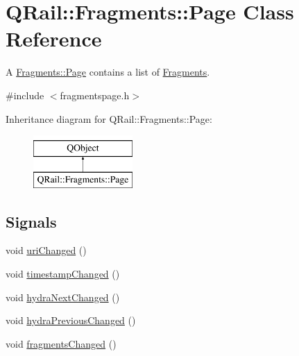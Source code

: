 \hypertarget{classQRail_1_1Fragments_1_1Page}{}\section{Q\+Rail\+::Fragments\+::Page Class Reference}
\label{classQRail_1_1Fragments_1_1Page}


A \mbox{\hyperlink{classQRail_1_1Fragments_1_1Page}{Fragments\+::\+Page}} contains a list of \mbox{\hyperlink{namespaceQRail_1_1Fragments}{Fragments}}.  




{\ttfamily \#include $<$fragmentspage.\+h$>$}

Inheritance diagram for Q\+Rail\+::Fragments\+::Page\+:\begin{figure}[H]
\begin{center}
\leavevmode
\includegraphics[height=2.000000cm]{classQRail_1_1Fragments_1_1Page}
\end{center}
\end{figure}
\subsection*{Signals}
\begin{DoxyCompactItemize}
\item 
void \mbox{\hyperlink{classQRail_1_1Fragments_1_1Page_a87f9b4f40af2e858ea3e046a2107631e}{uri\+Changed}} ()
\item 
void \mbox{\hyperlink{classQRail_1_1Fragments_1_1Page_ad20cb20db04844c84f6c5b5217b6742c}{timestamp\+Changed}} ()
\item 
void \mbox{\hyperlink{classQRail_1_1Fragments_1_1Page_a37660e9c74322edef13d9c27633ad749}{hydra\+Next\+Changed}} ()
\item 
void \mbox{\hyperlink{classQRail_1_1Fragments_1_1Page_a46ef4cd59dea07b094e432445a103597}{hydra\+Previous\+Changed}} ()
\item 
void \mbox{\hyperlink{classQRail_1_1Fragments_1_1Page_a7403651ceb8ea2d7fb8c13ae9b46dc44}{fragments\+Changed}} ()
\end{DoxyCompactItemize}
